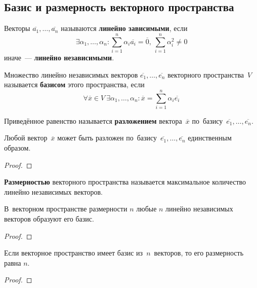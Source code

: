 \subsection{Базис и размерность векторного пространства}
Векторы $\overline{a_1}, \ldots, \overline{a_n}$ называются \textbf{линейно зависимыми}, если
\begin{equation*}
\exists \alpha_1, \ldots, \alpha_n \colon
\sum_{i=1}^n \alpha_i \overline{a_i} = \overline 0, \ 
\sum_{i=1}^n \alpha_i^2 \neq 0
\end{equation*}
иначе~--- \textbf{линейно независимыми}.

Множество линейно независимых векторов $\overline{e_1}, \ldots, \overline{e_n}$ векторного пространства~$V$ называется \textbf{базисом} этого пространства, если
\begin{equation*}
\forall \overline x \in V \ 
\exists \alpha_1, \ldots, \alpha_n \colon
\overline x = \sum_{i=1}^n \alpha_i \overline{e_i}
\end{equation*}

Приведённое равенство называется \textbf{разложением} вектора~$\overline x$ по~базису~$\overline{e_1}, \ldots, \overline{e_n}$.

\begin{theorem}[о базисе]
Любой вектор~$\overline x$ может быть разложен по~базису~$\overline{e_1}, \ldots, \overline{e_n}$ единственным образом.
\end{theorem}
\begin{proof}

\end{proof}

\textbf{Размерностью} векторного пространства называется максимальное количество линейно независимых векторов.

\begin{theorem}
В~векторном пространстве размерности $n$ любые $n$ линейно независимых векторов образуют его базис.
\end{theorem}
\begin{proof}

\end{proof}

\begin{theorem}
Если векторное пространство имеет базис из~$n$~векторов, то его размерность равна $n$.
\end{theorem}
\begin{proof}

\end{proof}